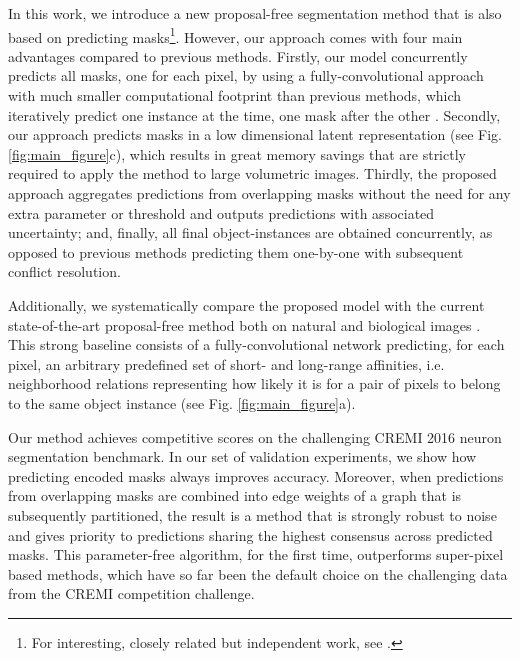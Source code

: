 In this work, we introduce a new proposal-free segmentation method that is also based on predicting \maskname masks\footnote{For interesting, closely related but independent work, see \cite{hirsch2020patchperpix}.}.
However, our approach comes with four main advantages compared to previous methods.
Firstly, our model concurrently predicts all \maskname masks, one for each pixel, by using a fully-convolutional approach with much smaller computational footprint than previous methods, which iteratively predict one instance at the time, one mask after the other \cite{januszewski2018high,meirovitch2016multi}.
Secondly, our approach predicts \maskname masks in a low dimensional latent representation (see Fig. \ref{fig:main_figure}c), which results in great memory savings that are strictly required to apply the method to large volumetric images. 
Thirdly, the proposed approach aggregates predictions from overlapping \maskname masks without the need for any extra parameter or threshold and outputs predictions with associated uncertainty;
and, finally, all final object-instances are obtained concurrently, as opposed to previous methods predicting them one-by-one with subsequent conflict resolution. 


Additionally, we systematically compare the proposed model with the current state-of-the-art proposal-free method both on natural and biological images \cite{liu2018affinity,Gao_2019_ICCV,lee2017superhuman,wolf2018mutex,bailoni2019generalized}. This strong baseline consists of a fully-convolutional network predicting, for each pixel, an arbitrary predefined set of short- and long-range affinities, i.e. neighborhood relations representing how likely it is for a pair of pixels to belong to the same object instance (see Fig. \ref{fig:main_figure}a). 

Our method achieves competitive scores on the challenging CREMI 2016 neuron segmentation benchmark. In our set of validation experiments, we show how predicting encoded \maskname masks always improves accuracy. Moreover, when predictions from overlapping masks are combined into edge weights of a graph that is subsequently partitioned, the result is a method that is strongly robust to noise and gives priority to predictions sharing the highest consensus across predicted masks. 
This parameter-free algorithm, for the first time, outperforms super-pixel based methods, which have so far been the default choice on the challenging data from the CREMI competition challenge.


